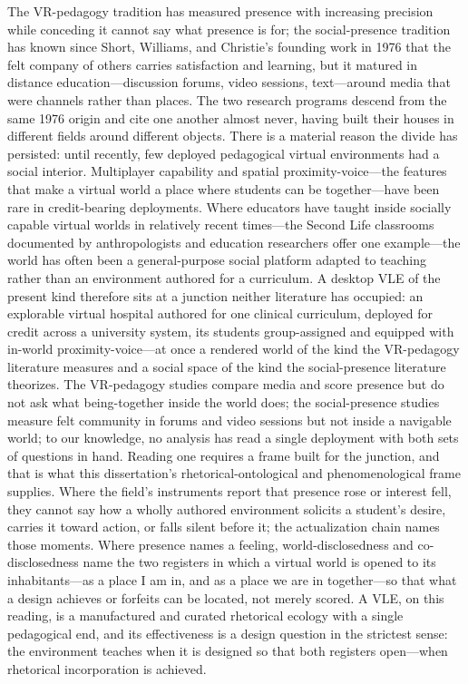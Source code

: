 The VR-pedagogy tradition has measured presence with increasing precision while
conceding it cannot say what presence is for; the social-presence tradition has
known since Short, Williams, and Christie's founding work in 1976 that the felt
company of others carries satisfaction and learning, but it matured in distance
education---discussion forums, video sessions, text---around media that were
channels rather than places. The two research programs descend from the same
1976 origin and cite one another almost never, having built their houses in
different fields around different objects. There is a material reason the
divide has persisted: until recently, few deployed pedagogical virtual
environments had a social interior. Multiplayer capability and spatial
proximity-voice---the features that make a virtual world a place where students
can be together---have been rare in credit-bearing deployments. Where educators
have taught inside socially capable virtual worlds in relatively recent
times---the Second Life classrooms documented by anthropologists and education
researchers offer one example---the world has often been a general-purpose
social platform adapted to teaching rather than an environment authored for a
curriculum. A desktop VLE of the present kind therefore sits at a junction
neither literature has occupied: an explorable virtual hospital authored for one
clinical curriculum, deployed for credit across a university system, its
students group-assigned and equipped with in-world proximity-voice---at once a
rendered world of the kind the VR-pedagogy literature measures and a social
space of the kind the social-presence literature theorizes. The VR-pedagogy
studies compare media and score presence but do not ask what being-together
inside the world does; the social-presence studies measure felt community in
forums and video sessions but not inside a navigable world; to our knowledge, no
analysis has read a single deployment with both sets of questions in hand.
Reading one requires a frame built for the junction, and that is what this
dissertation's rhetorical-ontological and phenomenological frame supplies. Where
the field's instruments report that presence rose or interest fell, they cannot
say how a wholly authored environment solicits a student's desire, carries it
toward action, or falls silent before it; the actualization chain names those
moments.
Where presence names a feeling, world-disclosedness and co-disclosedness name
the two registers in which a virtual world is opened to its inhabitants---as a
place I am in, and as a place we are in together---so that what a design
achieves or forfeits can be located, not merely scored. A VLE, on this reading,
is a manufactured and curated rhetorical ecology with a single pedagogical end,
and its effectiveness is a design question in the strictest sense: the
environment teaches when it is designed so that both registers open---when
rhetorical incorporation is achieved.

